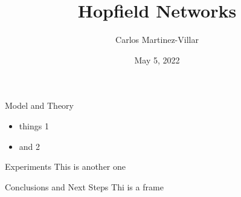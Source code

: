 \documentclass[10pt]{beamer}
\title{Hopfield Networks}
\author[STAT9100-Final Project]{Carlos Martinez-Villar}
\date{May 5, 2022}
\begin{document}
\begin{frame}
	\titlepage
\end{frame}

\begin{frame}{Model and Theory}
	\begin{itemize}
		\item things 1
		\item and 2
	\end{itemize}
\end{frame}

\begin{frame}{Experiments}	
This is another one
\end{frame}

\begin{frame}{Conclusions and Next Steps}
Thi is a frame
\end{frame}
\end{document}
